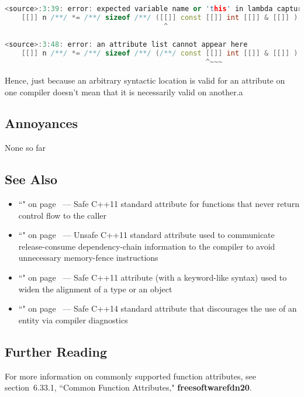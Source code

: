 \begin{lstlisting}[language=C++]
<source>:3:39: error: expected variable name or 'this' in lambda capture list
    [[]] n /**/ *= /**/ sizeof /**/ ([[]] const [[]] int [[]] & [[]] ) /**/;
                                      ^

<source>:3:48: error: an attribute list cannot appear here
    [[]] n /**/ *= /**/ sizeof /**/ (/**/ const [[]] int [[]] & [[]] ) /**/;
                                                ^~~~
\end{lstlisting}
    
\noindent Hence, just because an arbitrary syntactic location is valid for an
attribute on one compiler doesn't mean that it is necessarily valid on
another.a

\subsection[Annoyances]{Annoyances}\label{annoyances}

None so far

\subsection[See Also]{See Also}\label{see-also}

\begin{itemize}
\item{``" on page~\pageref{the-noreturn-attribute} — Safe C++11 standard attribute for functions that never return control flow to the caller}
\item{``" on page~\pageref{carriesdependency} — Unsafe C++11 standard attribute used to communicate release-consume dependency-chain information to the compiler to avoid unnecessary memory-fence instructions}
\item{``" on page~\pageref{alignas} --- Safe C++11 attribute (with a keyword-like syntax) used to widen the alignment of a type or an object}
\item{``" on page~\pageref{deprecated} — Safe C++14 standard attribute that discourages the use of an entity via compiler diagnostics}
\end{itemize}

\subsection[Further Reading]{Further Reading}\label{attribute-further-reading}

For more information on commonly supported function attributes, see
section~6.33.1, ``Common Function Attributes," \textbf{{freesoftwarefdn20}}.


